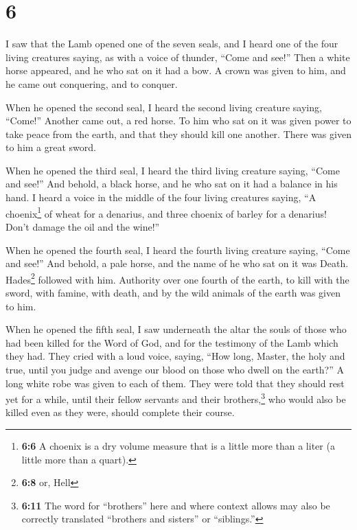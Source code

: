\hypertarget{section-5}{%
\section{6}\label{section-5}}

 I saw that the Lamb opened one of the seven seals, and I
heard one of the four living creatures saying, as with a voice of
thunder, ``Come and see!''  Then a white horse appeared,
and he who sat on it had a bow. A crown was given to him, and he came
out conquering, and to conquer.

 When he opened the second seal, I heard the second living
creature saying, ``Come!''  Another came out, a red horse.
To him who sat on it was given power to take peace from the earth, and
that they should kill one another. There was given to him a great sword.

 When he opened the third seal, I heard the third living
creature saying, ``Come and see!'' And behold, a black horse, and he who
sat on it had a balance in his hand.  I heard a voice in
the middle of the four living creatures saying, ``A choenix\footnote{\textbf{6:6}
  A choenix is a dry volume measure that is a little more than a liter
  (a little more than a quart).} of wheat for a denarius, and three
choenix of barley for a denarius! Don't damage the oil and the wine!''

 When he opened the fourth seal, I heard the fourth living
creature saying, ``Come and see!''  And behold, a pale
horse, and the name of he who sat on it was Death. Hades\footnote{\textbf{6:8}
  or, Hell} followed with him. Authority over one fourth of the earth,
to kill with the sword, with famine, with death, and by the wild animals
of the earth was given to him.

 When he opened the fifth seal, I saw underneath the altar
the souls of those who had been killed for the Word of God, and for the
testimony of the Lamb which they had.  They cried with a
loud voice, saying, ``How long, Master, the holy and true, until you
judge and avenge our blood on those who dwell on the earth?''
 A long white robe was given to each of them. They were
told that they should rest yet for a while, until their fellow servants
and their brothers,\footnote{\textbf{6:11} The word for ``brothers''
  here and where context allows may also be correctly translated
  ``brothers and sisters'' or ``siblings.''} who would also be killed
even as they were, should complete their course.

